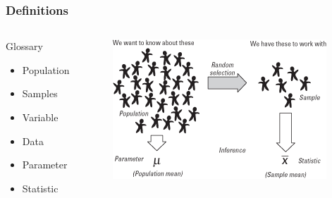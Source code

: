 \documentclass[10pt, compress]{beamer}
\begin{document}
\begin{frame}
    \frametitle{Definitions}
    \begin{columns}
        \begin{block}{Glossary}
            \begin{itemize}
                \item Population
                \item Samples
                \item Variable
                \item Data
                \item Parameter
                \item Statistic
            \end{itemize}
        \end{block}
        \begin{block}{}
            \begin{figure}
                \begin{center}
                    \includegraphics[scale=0.7]{img/as1-10-popvsam.png}
                \end{center}
            \end{figure}
        \end{block}
    \end{columns}
\end{frame}

%
%
\end{document}
